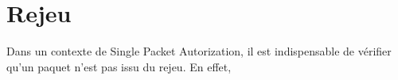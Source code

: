 \chapter{Rejeu}

Dans un contexte de Single Packet Autorization, il est indispensable de vérifier qu'un paquet n'est pas issu du rejeu. En effet, 

